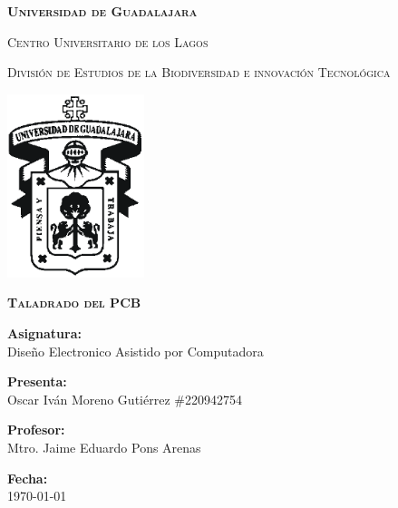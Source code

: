 \documentclass[12pt]{report}
\begin{document}
\setlength{\hoffset}{27 pt} %
\begin{titlepage}
{\centering
{\scshape\bfseries\fontsize{29.16}{34.992}\selectfont Universidad de Guadalajara \par}
\vspace{0.5cm}
{\scshape\Large Centro Universitario de los Lagos \par}
\vspace{1cm}
{\scshape\Large División de Estudios de la Biodiversidad e innovación Tecnológica \par}
\vspace{1cm}
{\graphicspath{{imagenes/Portada}} %
\includegraphics[width=0.3\textwidth]{image.png}\par}
\vspace{1cm}
{\scshape\large\bfseries Taladrado del PCB \par}
\vspace{1.5cm}
{\large \textbf{Asignatura:} \\Diseño Electronico Asistido por Computadora\par}
\vfill
{\large \textbf{Presenta:} \\Oscar Iván Moreno Gutiérrez \#220942754\par}
\vfill
{\large \textbf{Profesor:} \\Mtro. Jaime Eduardo Pons Arenas \par}
\vfill
\vfill
\begin{flushright}
  {\normalsize \textbf {Fecha:} \\ \today}
\end{flushright}
\vfill}
{\large  \par}
\end{titlepage}

\tableofcontents
\newpage
\end{document}
